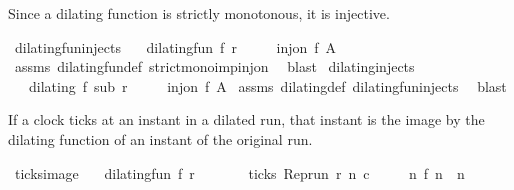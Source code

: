 \begin{isabellebody}
\isamarkupfalse%
%
\endisatagproof
{\isafoldproof}%
%
\isadelimproof
%
\endisadelimproof
%
\isadelimdocument
%
\endisadelimdocument
%
\isatagdocument
%
\isamarkuptrue%
%
\endisatagdocument
{\isafolddocument}%
%
\isadelimdocument
%
\endisadelimdocument
%
\begin{isamarkuptext}%
Since a dilating function is strictly monotonous, it is injective.%
\end{isamarkuptext}\isamarkuptrue%
\isamarkupfalse%
\ dilating{\isacharunderscore}fun{\isacharunderscore}injects{\isacharcolon}\isanewline
\ \ \ {\isacartoucheopen}dilating{\isacharunderscore}fun\ f\ r{\isacartoucheclose}\isanewline
\ \ \ \ \ {\isacartoucheopen}inj{\isacharunderscore}on\ f\ A{\isacartoucheclose}\isanewline
%
\isadelimproof
%
\endisadelimproof
%
\isatagproof
{}\isamarkupfalse%
\ assms\ dilating{\isacharunderscore}fun{\isacharunderscore}def\ strict{\isacharunderscore}mono{\isacharunderscore}imp{\isacharunderscore}inj{\isacharunderscore}on\ \isamarkupfalse%
\ blast%
\endisatagproof
{\isafoldproof}%
%
\isadelimproof
\isanewline
%
\endisadelimproof
\isanewline
{}\isamarkupfalse%
\ dilating{\isacharunderscore}injects{\isacharcolon}\isanewline
\ \ \ {\isacartoucheopen}dilating\ f\ sub\ r{\isacartoucheclose}\isanewline
\ \ \ \ \ {\isacartoucheopen}inj{\isacharunderscore}on\ f\ A{\isacartoucheclose}\isanewline
%
\isadelimproof
%
\endisadelimproof
%
\isatagproof
{}\isamarkupfalse%
\ assms\ dilating{\isacharunderscore}def\ dilating{\isacharunderscore}fun{\isacharunderscore}injects\ \isamarkupfalse%
\ blast%
\endisatagproof
{\isafoldproof}%
%
\isadelimproof
%
\endisadelimproof
%
\begin{isamarkuptext}%
If a clock ticks at an instant in a dilated run, that instant is the image
  by the dilating function of an instant of the original run.%
\end{isamarkuptext}\isamarkuptrue%
\isamarkupfalse%
\ ticks{\isacharunderscore}image{\isacharcolon}\isanewline
\ \ \ {\isacartoucheopen}dilating{\isacharunderscore}fun\ f\ r{\isacartoucheclose}\isanewline
\ \ \ \ \ \ \ {\isacartoucheopen}ticks\ {\isacharparenleft}{\isacharparenleft}Rep{\isacharunderscore}run\ r{\isacharparenright}\ n\ c{\isacharparenright}{\isacartoucheclose}\isanewline
\ \ \ \ \ {\isacartoucheopen}{\isasymexists}n\ f\ n\ {\isacharequal}\ n{\isacartoucheclose}\isanewline

\end{isabellebody}
